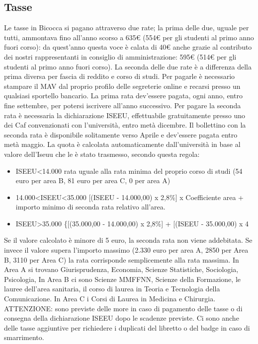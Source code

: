 \subsection{Tasse}

Le tasse in Bicocca si pagano attraverso due rate; la prima delle due, uguale per tutti, ammontava fino all'anno scorso a 635€ (554€ per gli studenti al primo anno fuori corso): da quest'anno questa voce è calata di 40€ anche grazie al contributo dei nostri rappresentanti in consiglio di amministrazione: 595€ (514€ per gli studenti al primo anno fuori corso). La seconda delle due rate è a differenza della prima diversa per fascia di reddito e corso di studi. 
Per pagarle è necessario stampare il MAV dal proprio profilo delle segreterie online e recarsi presso un qualsiasi sportello bancario. La prima rata dev'essere pagata, ogni anno, entro fine settembre, per potersi iscrivere all'anno successivo. Per pagare la seconda rata è necessaria la dichiarazione ISEEU, effettuabile gratuitamente presso uno dei Caf convenzionati con l'università, entro metà dicembre. 
Il bollettino con la seconda rata è disponibile solitamente verso Aprile e dev'essere pagata entro metà maggio. La quota è calcolata automaticamente dall'università in base al valore dell'Iseuu che le è stato trasmesso, secondo questa regola: 
\begin{itemize}
 \item ISEEU<14.000 rata uguale alla rata minima del proprio corso di studi (54 euro per area B, 81 euro per area C, 0 per area A)
 \item 14.000<ISEEU<35.000 [(ISEEU - 14.000,00) x 2,8\%] x Coefficiente area + importo minimo di seconda rata relativo all'area.
 \item ISEEU>35.000 \{[(35.000,00 - 14.000,00) x 2,8\%] + [(ISEEU - 35.000,00) x 4%
\end{itemize}

Se il valore calcolato è minore di 5 euro, la seconda rata non viene addebitata. Se invece il valore supera l'importo massimo (2.330 euro per area A, 2850 per Area B, 3110 per Area C) la rata corrisponde semplicemente alla rata massima. In Area A si trovano Giurisprudenza, Economia, Scienze Statistiche, Sociologia, Psicologia, In Area B ci sono Scienze MMFFNN, Scienze della Formazione, le lauree dell'area sanitaria, il corso di laurea in Teoria e Tecnologia della Comunicazione. In Area C i Corsi di Laurea in Medicina e Chirurgia. 
ATTENZIONE: sono previste delle more in caso di pagamento delle tasse o di consegna della dichiarazione ISEEU dopo le scadenze previste. Ci sono anche delle tasse aggiuntive per richiedere i duplicati del libretto o del badge in caso di smarrimento.

